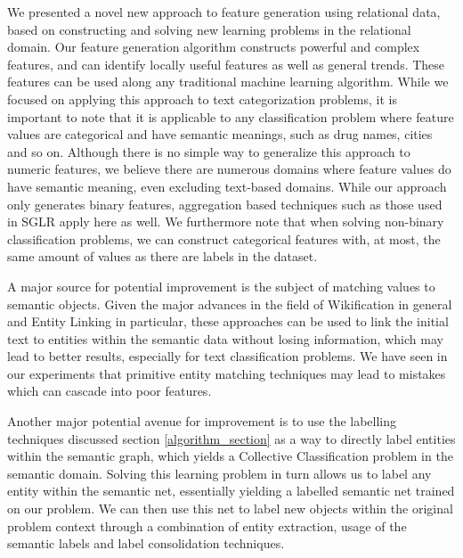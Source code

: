 \documentclass[twoside,11pt]{article}
\theoremstyle{definition}
\begin{document}
We presented a novel new approach to feature generation using relational data, based on constructing and solving new learning problems in the relational domain. 
Our feature generation algorithm constructs powerful and complex features, and can identify locally useful features as well as general trends. These features can be used along any traditional machine learning algorithm.
While we focused on applying this approach to text categorization problems, it is important to note that it is applicable to any classification problem where feature values are categorical and have semantic meanings, such as drug names, cities and so on. Although there is no simple way to generalize this approach to numeric features, we believe there are numerous domains where feature values do have semantic meaning, even excluding text-based domains.
While our approach only generates binary features, aggregation based techniques such as those used in SGLR apply here as well. We furthermore note that when solving non-binary classification problems, we can construct categorical features with, at most, the same amount of values as there are labels in the dataset.

A major source for potential improvement is the subject of matching values to semantic objects. Given the major advances in the field of Wikification \cite{bunescu2006using} in general and Entity Linking \cite{rao2013entity} in particular, these approaches can be used to link the initial text to entities within the semantic data without losing information, which may lead to better results, especially for text classification problems. We have seen in our experiments that primitive entity matching techniques may lead to mistakes which can cascade into poor features.

Another major potential avenue for improvement is to use the labelling techniques discussed section \ref{algorithm_section} as a way to directly label entities within the semantic graph, which yields a Collective Classification \cite{kajdanowicz2013collective} problem in the semantic domain. Solving this learning problem in turn allows us to label any entity within the semantic net, essentially yielding a labelled semantic net trained on our problem. We can then use this net to label new objects within the original problem context through a combination of entity extraction, usage of the semantic labels and label consolidation techniques.

\vskip 0.2in


%
%
\end{document}
